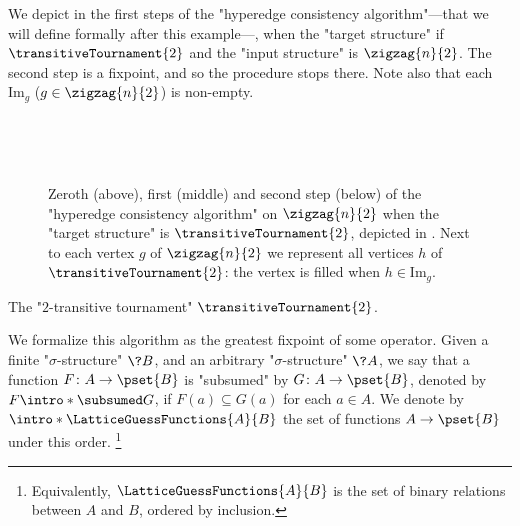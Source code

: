\begin{example}
	\AP\label{ex:zigzag-HC-T2}
	We depict in  the first steps of the "hyperedge consistency algorithm"---that we will define formally after this example---, when the "target structure"
	if $\transitiveTournament{2}$ and the "input structure" is $\zigzag{n}{2}$.
	The second step is a fixpoint, and so the procedure stops there. Note also that
	each $\textrm{Im}_g$ ($g\in \zigzag{n}{2}$) is non-empty. 
\end{example}

\begin{figure}
	\centering
	\begin{tikzpicture}
		
		
	\end{tikzpicture}\\[2em]
	\begin{tikzpicture}
		
		
	\end{tikzpicture}\\[2em]
	\begin{tikzpicture}
		
		
	\end{tikzpicture}
	\caption{\AP\label{fig:zigzag-graph-HC-T2} Zeroth (above), first (middle) and second step (below) of the "hyperedge consistency algorithm" on $\zigzag{n}{2}$
	when the "target structure" is $\transitiveTournament{2}$, depicted in . Next to each vertex $g$ of $\zigzag{n}{2}$ we represent
	all vertices $h$ of $\transitiveTournament{2}$: the vertex is filled
	when $h \in \textrm{Im}_{g}$.
	}
\end{figure}
\begin{marginfigure}[-15.5em]
	\centering
	\begin{tikzpicture}
		
	\end{tikzpicture}
	\caption{
		\AP\label{fig:zigzag-graph-HC-T2-side-T2}
		The "$2$-transitive tournament" $\transitiveTournament{2}$.
	}
\end{marginfigure}

We formalize this algorithm as the greatest fixpoint of some operator.
Given a finite "$\sigma$-structure" $\?B$, and an arbitrary%
"$\sigma$-structure" $\?A$, we say that a function $F\colon A \to \pset{B}$ is "subsumed"
by $G\colon A \to \pset{B}$, denoted by \AP\(F \intro*\subsumed G\),
if $F(a) \subseteq G(a)$ for each $a \in A$. We denote by
\AP\(\intro*\LatticeGuessFunctions{A}{B}\) the set of functions $A \to \pset{B}$ under this order.%
\footnote{Equivalently, $\LatticeGuessFunctions{A}{B}$ is the
set of binary relations between $A$ and $B$, ordered by inclusion.}

